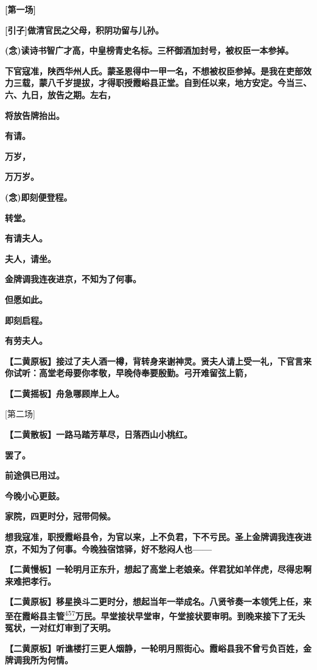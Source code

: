 \textbf{{[}第一场{]}}

\textbf{{[}引子{]}做清官民之父母，积阴功留与儿孙。}

\textbf{(念)读诗书智广才高，中皇榜青史名标。三杯御酒加封号，被权臣一本参掉。}

\textbf{下官寇准，陕西华州人氏。蒙圣恩得中一甲一名，不想被权臣参掉。是我在吏部效力三载，蒙八千岁提拔，才得职授霞峪县正堂。自到任以来，地方安定。今当三、六、九日，放告之期。左右，}

\textbf{将放告牌抬出。}

\textbf{有请。}

\textbf{万岁，}

\textbf{万万岁。}

\textbf{(念)即刻便登程。}

\textbf{转堂。}

\textbf{有请夫人。}

\textbf{夫人，请坐。}

\textbf{金牌调我连夜进京，不知为了何事。}

\textbf{但愿如此。}

\textbf{即刻启程。}

\textbf{有劳夫人。}

\textbf{【二黄原板】接过了夫人酒一樽，背转身来谢神灵。贤夫人请上受一礼，下官言来你试听：高堂老母要你孝敬，早晚侍奉要殷勤。弓开难留弦上箭，}

\textbf{【二黄摇板】舟急哪顾岸上人。}

{[}第二场{]}

\textbf{【二黄散板】一路马踏芳草尽，日落西山小桃红。}

\textbf{罢了。}

\textbf{前途俱已用过。}

\textbf{今晚小心更鼓。}

\textbf{家院，四更时分，冠带伺候。}

\textbf{想我寇准，职授霞峪县令，为官以来，上不负君，下不亏民。圣上金牌调我连夜进京，不知为了何事。今晚独宿馆驿，好不愁闷人也------}

\textbf{【二黄慢板】一轮明月正东升，想起了高堂上老娘亲。伴君犹如羊伴虎，尽得忠啊来难把孝行。}

\textbf{【二黄原板】移星换斗二更时分，想起当年一举成名。八贤爷奏一本领凭上任，来至在霞峪县主管}\protect\hyperlink{fn457}{\textsuperscript{457}}\textbf{万民。早堂接状早堂审，午堂接状要审明。到晚来接下了无头冤状，一对红灯审到了天明。}

\textbf{【二黄原板】听谯楼打三更人烟静，一轮明月照街心。霞峪县我不曾亏负百姓，金牌调我所为何情。}

